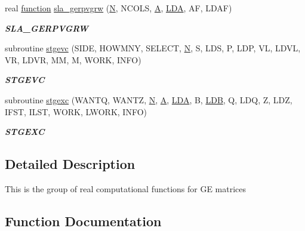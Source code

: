 \begin{DoxyCompactItemize}
real \hyperlink{afunc_8m_a7b5e596df91eadea6c537c0825e894a7}{function} \hyperlink{group__realGEcomputational_gabe2075a63cd1cd91a5fa0b521868f0d4}{sla\+\_\+gerpvgrw} (\hyperlink{polmisc_8c_a0240ac851181b84ac374872dc5434ee4}{N}, N\+C\+O\+L\+S, \hyperlink{classA}{A}, \hyperlink{example__user_8c_ae946da542ce0db94dced19b2ecefd1aa}{L\+D\+A}, A\+F, L\+D\+A\+F)
\begin{DoxyCompactList}\small\item\em {\bfseries S\+L\+A\+\_\+\+G\+E\+R\+P\+V\+G\+R\+W} \end{DoxyCompactList}\item 
subroutine \hyperlink{group__realGEcomputational_ga2e9d9ccc8569cb5d6e38371c61c37de1}{stgevc} (S\+I\+D\+E, H\+O\+W\+M\+N\+Y, S\+E\+L\+E\+C\+T, \hyperlink{polmisc_8c_a0240ac851181b84ac374872dc5434ee4}{N}, S, L\+D\+S, P, L\+D\+P, V\+L, L\+D\+V\+L, V\+R, L\+D\+V\+R, M\+M, M, W\+O\+R\+K, I\+N\+F\+O)
\begin{DoxyCompactList}\small\item\em {\bfseries S\+T\+G\+E\+V\+C} \end{DoxyCompactList}\item 
subroutine \hyperlink{group__realGEcomputational_ga1af98b467b76dca2231f57debae966c5}{stgexc} (W\+A\+N\+T\+Q, W\+A\+N\+T\+Z, \hyperlink{polmisc_8c_a0240ac851181b84ac374872dc5434ee4}{N}, \hyperlink{classA}{A}, \hyperlink{example__user_8c_ae946da542ce0db94dced19b2ecefd1aa}{L\+D\+A}, B, \hyperlink{example__user_8c_a50e90a7104df172b5a89a06c47fcca04}{L\+D\+B}, Q, L\+D\+Q, Z, L\+D\+Z, I\+F\+S\+T, I\+L\+S\+T, W\+O\+R\+K, L\+W\+O\+R\+K, I\+N\+F\+O)
\begin{DoxyCompactList}\small\item\em {\bfseries S\+T\+G\+E\+X\+C} \end{DoxyCompactList}\end{DoxyCompactItemize}


\subsection{Detailed Description}
This is the group of real computational functions for G\+E matrices 

\subsection{Function Documentation}
\hypertarget{group__realGEcomputational_gad036a50aafd810967583ed8854e6cd3a}{}
